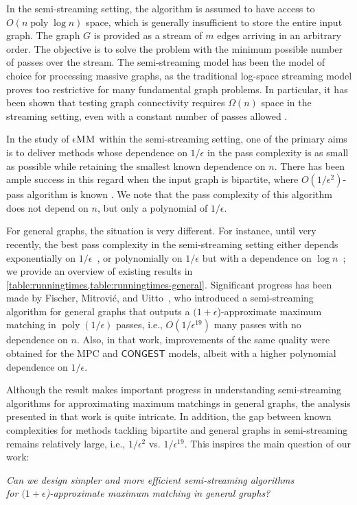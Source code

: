 \documentclass{article}
\newcommand{\eps}{\epsilon}
\newcommand{\Omg}{\Omega}
\DeclareMathOperator{\poly}{poly}
\def\CONGEST{\ensuremath{\mathsf{CONGEST}}\xspace}
\newcommand{\eMM}{\eps\textsc{MM}}
\begin{document}
In the semi-streaming setting, the algorithm is assumed to have access to $O(n \poly \log n)$ space, which is generally insufficient to store the entire input graph.
The graph $G$ is provided as a stream of $m$ edges arriving in an arbitrary order.
The objective is to solve the problem with the minimum possible number of passes over the stream.
The semi-streaming model has been the model of choice for processing massive graphs, as the traditional log-space streaming model proves too restrictive for many fundamental graph problems.
In particular, it has been shown that testing graph connectivity requires $\Omg(n)$ space in the streaming setting, even with a constant number of passes allowed \cite{10.5555/327766.327782}.

In the study of $\eMM$ within the semi-streaming setting, one of the primary aims is to deliver methods whose dependence on $1/\eps$ in the pass complexity is as small as possible while retaining the smallest known dependence on $n$.
There has been ample success in this regard when the input graph is bipartite, where $O(1/\eps^2)$-pass algorithm is known \cite{assadi2021auction}.
We note that the pass complexity of this algorithm does not depend on $n$, but only a polynomial of $1/\eps$.

For general graphs, the situation is very different. 
For instance, until very recently, the best pass complexity in the semi-streaming setting either depends exponentially on $1/\eps$~\cite{mcgregor2005finding,tirodkar2018deterministic,gamlath2019weighted}, or polynomially on $1/\eps$ but with a dependence on $\log n$~\cite{ahn2013linear,ahn2011laminar,ahn2018access,assadi2022semi,assadi2024simple}; we provide an overview of existing results in \cref{table:runningtimes,table:runningtimes-general}. 
Significant progress has been made by Fischer, Mitrovi\' c, and Uitto~\cite{FMU22}, who introduced a semi-streaming algorithm for general graphs that outputs a $(1+\eps$)-approximate maximum matching in $\poly(1/\eps)$ passes, i.e., $O(1/\eps^{19})$ many passes with no dependence on $n$.
Also, in that work, improvements of the same quality were obtained for the MPC and \CONGEST models, albeit with a higher polynomial dependence on $1/\eps$.

Although the result \cite{FMU22} makes important progress in understanding semi-streaming algorithms for approximating maximum matchings in general graphs, the analysis presented in that work is quite intricate.
In addition, the gap between known complexities for methods tackling bipartite and general graphs in semi-streaming remains relatively large, i.e., $1/\eps^2$ vs. $1/\eps^{19}$. This inspires the main question of our work:
\begin{center}
    \emph{Can we design simpler and more efficient semi-streaming algorithms \\ for $(1+\eps$)-approximate maximum matching in general graphs?}
\end{center}
\end{document}
